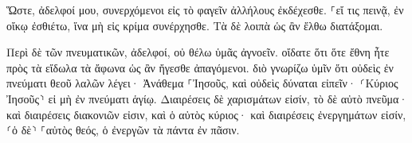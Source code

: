\documentclass{openreader}
\begin{document}
Ὥστε, ἀδελφοί μου, συνερχόμενοι εἰς τὸ φαγεῖν ἀλλήλους ἐκδέχεσθε. 
⸀εἴ τις πεινᾷ, ἐν οἴκῳ ἐσθιέτω, ἵνα μὴ εἰς κρίμα συνέρχησθε. Τὰ δὲ λοιπὰ ὡς ἂν ἔλθω διατάξομαι. 

Περὶ δὲ τῶν πνευματικῶν, ἀδελφοί, οὐ θέλω ὑμᾶς ἀγνοεῖν. 
οἴδατε ὅτι ὅτε ἔθνη ἦτε πρὸς τὰ εἴδωλα τὰ ἄφωνα ὡς ἂν ἤγεσθε ἀπαγόμενοι. 
διὸ γνωρίζω ὑμῖν ὅτι οὐδεὶς ἐν πνεύματι θεοῦ λαλῶν λέγει· Ἀνάθεμα ⸀Ἰησοῦς, καὶ οὐδεὶς δύναται εἰπεῖν· ⸂Κύριος Ἰησοῦς⸃ εἰ μὴ ἐν πνεύματι ἁγίῳ. 
Διαιρέσεις δὲ χαρισμάτων εἰσίν, τὸ δὲ αὐτὸ πνεῦμα· 
καὶ διαιρέσεις διακονιῶν εἰσιν, καὶ ὁ αὐτὸς κύριος· 
καὶ διαιρέσεις ἐνεργημάτων εἰσίν, ⸂ὁ δὲ⸃ ⸀αὐτὸς θεός, ὁ ἐνεργῶν τὰ πάντα ἐν πᾶσιν. 
\end{document}
